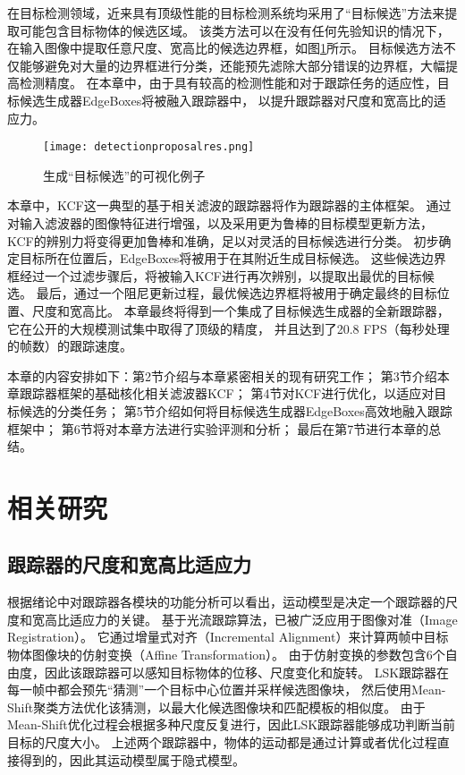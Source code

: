 在目标检测领域，近来具有顶级性能的目标检测系统均采用了``目标候选''方法来提取可能包含目标物体的候选区域。
该类方法可以在没有任何先验知识的情况下，在输入图像中提取任意尺度、宽高比的候选边界框，如图\ref{detectionproposalres}所示。
目标候选方法不仅能够避免对大量的边界框进行分类，还能预先滤除大部分错误的边界框，大幅提高检测精度。
在本章中，由于具有较高的检测性能和对于跟踪任务的适应性，目标候选生成器EdgeBoxes将被融入跟踪器中，
以提升跟踪器对尺度和宽高比的适应力。

\begin{figure}[htb]
\centering
\texttt{[image: detectionproposalres.png]}
\caption{生成``目标候选''的可视化例子}
\label{detectionproposalres}
\end{figure}

本章中，KCF这一典型的基于相关滤波的跟踪器将作为跟踪器的主体框架。
通过对输入滤波器的图像特征进行增强，以及采用更为鲁棒的目标模型更新方法，
KCF的辨别力将变得更加鲁棒和准确，足以对灵活的目标候选进行分类。
初步确定目标所在位置后，EdgeBoxes将被用于在其附近生成目标候选。
这些候选边界框经过一个过滤步骤后，将被输入KCF进行再次辨别，以提取出最优的目标候选。
最后，通过一个阻尼更新过程，最优候选边界框将被用于确定最终的目标位置、尺度和宽高比。
本章最终将得到一个集成了目标候选生成器的全新跟踪器，它在公开的大规模测试集中取得了顶级的精度，
并且达到了20.8 FPS（每秒处理的帧数）的跟踪速度。

本章的内容安排如下：第2节介绍与本章紧密相关的现有研究工作；
第3节介绍本章跟踪器框架的基础\pozhehao 核化相关滤波器KCF；
第4节对KCF进行优化，以适应对目标候选的分类任务；
第5节介绍如何将目标候选生成器EdgeBoxes高效地融入跟踪框架中；
第6节将对本章方法进行实验评测和分析；
最后在第7节进行本章的总结。

\section{相关研究}
\subsection{跟踪器的尺度和宽高比适应力}
根据绪论中对跟踪器各模块的功能分析可以看出，运动模型是决定一个跟踪器的尺度和宽高比适应力的关键。
\cite{survey51}基于光流跟踪算法，已被广泛应用于图像对准（Image Registration）。
它通过增量式对齐（Incremental Alignment）来计算两帧中目标物体图像块的仿射变换（Affine Transformation）。
由于仿射变换的参数包含6个自由度，因此该跟踪器可以感知目标物体的位移、尺度变化和旋转。
LSK跟踪器在每一帧中都会预先``猜测''一个目标中心位置并采样候选图像块，
然后使用Mean-Shift聚类方法优化该猜测，以最大化候选图像块和匹配模板的相似度。
由于Mean-Shift优化过程会根据多种尺度反复进行，因此LSK跟踪器能够成功判断当前目标的尺度大小。
上述两个跟踪器中，物体的运动都是通过计算或者优化过程直接得到的，因此其运动模型属于隐式模型。

